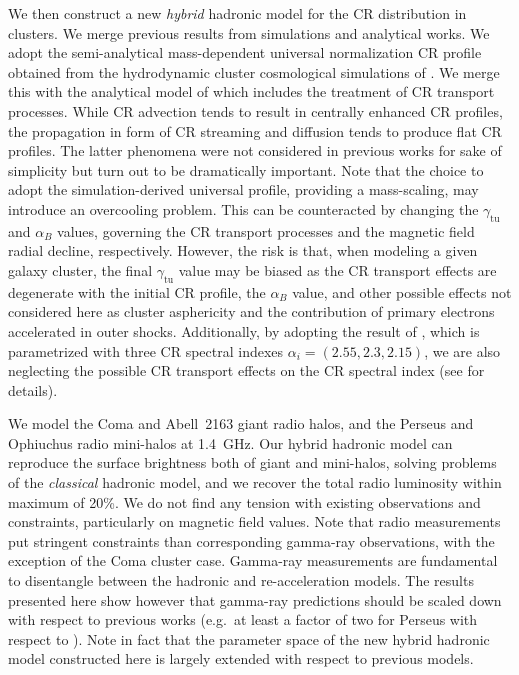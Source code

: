\documentclass[traditabstract]{aa}
\newcommand{\rmn}{\mathrm}
\begin{document}
We then construct a new \emph{hybrid} hadronic model for the CR distribution in clusters. We merge previous results from simulations and analytical works. We adopt the semi-analytical mass-dependent universal normalization CR profile obtained from the hydrodynamic cluster cosmological simulations of \cite{2010MNRAS.409..449P}. We merge this with the analytical model of \cite{2011A&A...527A..99E} which includes the treatment of CR transport processes. While CR advection tends to result in centrally enhanced CR profiles, the propagation in form of CR streaming and diffusion tends to produce flat CR profiles. The latter phenomena were not considered in previous works for sake of simplicity but turn out to be dramatically important. Note that the choice to adopt the \cite{2010MNRAS.409..449P} simulation-derived universal profile, providing a mass-scaling, may introduce an overcooling problem. This can be counteracted by changing the $\gamma_{\rmn{tu}}$ and $\alpha_B$ values, governing the CR transport processes and the magnetic field radial decline, respectively. However, the risk is that, when modeling a given galaxy cluster, the final $\gamma_{\rmn{tu}}$ value may be biased as the CR transport effects are degenerate with the initial CR profile, the $\alpha_B$ value, and other possible effects not considered here as cluster asphericity and the contribution of primary electrons accelerated in outer shocks. Additionally, by adopting the result of \cite{2010MNRAS.409..449P}, which is parametrized with three CR spectral indexes $\alpha_{i}=(2.55,2.3,2.15)$, we are also neglecting the possible CR transport effects on the CR spectral index (see \citealp{2011A&A...527A..99E} for details). 

We model the Coma and Abell~2163 giant radio halos, and the Perseus and Ophiuchus radio mini-halos at 1.4~GHz. Our hybrid hadronic model can reproduce the surface brightness both of giant and mini-halos, solving problems of the \emph{classical} hadronic model, and we recover the total radio luminosity within maximum of 20\%. We do not find any tension with existing observations and constraints, particularly on magnetic field values. Note that radio measurements put stringent constraints than corresponding gamma-ray observations, with the exception of the Coma cluster case. Gamma-ray measurements are fundamental to disentangle between the hadronic and re-acceleration models. The results presented here show however that gamma-ray predictions should be scaled down with respect to previous works (e.g.~at least a factor of two for Perseus with respect to \citealp{2010MNRAS.409..449P}). Note in fact that the parameter space of the new hybrid hadronic model constructed here is largely extended with respect to previous models.
\end{document}
